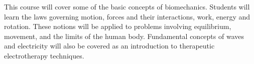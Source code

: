 {This course will cover some of the basic concepts of biomechanics. Students will learn the laws governing motion, forces and their interactions, work, energy and rotation. These notions will be applied to problems involving equilibrium, movement, and the limits of the human body. Fundamental concepts of waves and electricity will also be covered as an introduction to therapeutic electrotherapy techniques.}
